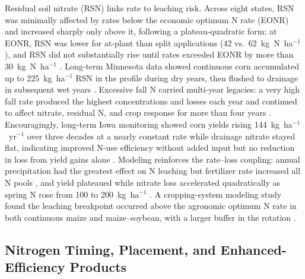 \documentclass[11pt]{article}
\begin{document}
Residual soil nitrate (RSN) links rate to leaching risk. Across eight states, RSN was minimally affected by rates below the economic optimum N rate (EONR) and increased sharply only above it, following a plateau-quadratic form; at EONR, RSN was lower for at-plant than split applications (42 vs.\ 62~kg~N~ha$^{-1}$), and RSN did not substantially rise until rates exceeded EONR by more than 30~kg~N~ha$^{-1}$ \parencite{Bandura2025}. Long-term Minnesota data showed continuous corn accumulated up to 225~kg~ha$^{-1}$ RSN in the profile during dry years, then flushed to drainage in subsequent wet years \parencite{Randall2001}. Excessive fall N carried multi-year legacies: a very high fall rate produced the highest concentrations and losses each year and continued to affect nitrate, residual N, and crop response for more than four years \parencite{Jaynes2015}. Encouragingly, long-term Iowa monitoring showed corn yields rising 144~kg~ha$^{-1}$~yr$^{-1}$ over three decades at a nearly constant rate while drainage nitrate stayed flat, indicating improved N-use efficiency without added input but no reduction in loss from yield gains alone \parencite{Clifford2023}. Modeling reinforces the rate--loss coupling: annual precipitation had the greatest effect on N leaching but fertilizer rate increased all N pools \parencite{Li2006}, and yield plateaued while nitrate loss accelerated quadratically as spring N rose from 100 to 200~kg~ha$^{-1}$ \parencite{Malone2007b}. A cropping-system modeling study found the leaching breakpoint occurred above the agronomic optimum N rate in both continuous maize and maize--soybean, with a larger buffer in the rotation \parencite{Pasley2021}.

\subsection{Nitrogen Timing, Placement, and Enhanced-Efficiency Products}
\end{document}
